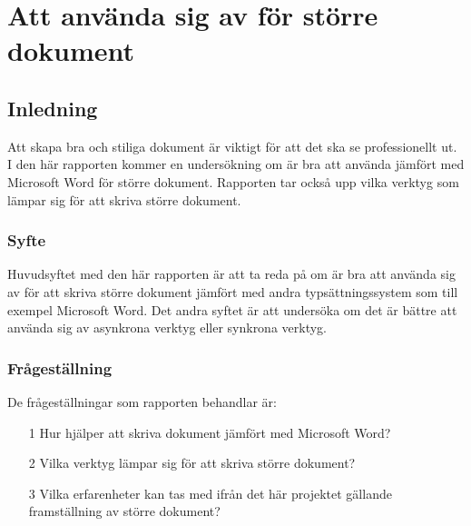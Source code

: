 \chapter{Att använda sig av \latex för större dokument}
\label{cha:indiv-report-tuhkala}

\section{Inledning}
\label{sec:introduction-tuhkala}
Att skapa bra och stiliga dokument är viktigt för att det ska se professionellt ut. I den här rapporten kommer en undersökning om \latex är bra att använda jämfört med Microsoft Word för större dokument. Rapporten tar också upp vilka verktyg som lämpar sig för att skriva större dokument.

\subsection{Syfte}
\label{sec:purpose-tuhkala}
Huvudsyftet med den här rapporten är att ta reda på om \latex är bra att använda sig av för att skriva större dokument jämfört med andra typsättningssystem som till exempel Microsoft Word. Det andra syftet är att undersöka om det är bättre att använda sig av asynkrona verktyg eller synkrona verktyg.

\subsection{Frågeställning}
\label{sec:issue-tuhkala}
De frågeställningar som rapporten behandlar är:

\begin{itemize}
	\item [1] Hur hjälper \latex att skriva dokument jämfört med Microsoft Word?
	\item [2] Vilka verktyg lämpar sig för att skriva större dokument?
	\item [3] Vilka erfarenheter kan tas med ifrån det här projektet gällande framställning av större dokument?
\end{itemize}

